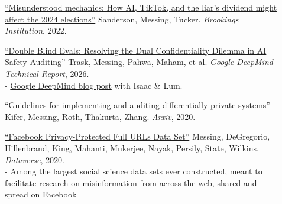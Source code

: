 \documentclass[letterpaper,11pt]{article}
\newcommand{\resheading}[1]{\vspace{4pt}{\large
\colorbox{mygrey}{\begin{minipage}{\textwidth}{\textbf{#1
\vphantom{p\^{E}}}}\end{minipage}}}\vspace{4pt}}
\begin{document}
\resheading{Reports \& Datasets}
\begin{description}

\item[] \href{https://www.brookings.edu/articles/misunderstood-mechanics-how-ai-tiktok-and-the-liars-dividend-might-affect-the-2024-elections/}{``Misunderstood mechanics: How AI, TikTok, and the liar's dividend might affect the 2024 elections''} Sanderson, Messing, Tucker.
\emph{Brookings Institution}, 2022. 

\item[] \href{https://storage.googleapis.com/deepmind-media/DeepMind.com/Blog/piloting-the-worlds-first-double-blind-ai-evaluations/double-blind-evaluations-technical-report.pdf}{``Double Blind Evals: Resolving the Dual Confidentiality Dilemma in AI Safety Auditing''} Trask, Messing, Pahwa, Maham, et al.
\emph{Google DeepMind Technical Report}, 2026. \\
- \href{https://deepmind.google/blog/piloting-the-worlds-first-double-blind-ai-evaluations/}{Google DeepMind blog post} with Isaac \& Lum.

\item[] \href{https://arxiv.org/abs/2002.04049}{``Guidelines for implementing and auditing differentially private systems''} Kifer, Messing, Roth, Thakurta, Zhang.
\emph{Arxiv}, 2020. 

\item[] \href{https://dataverse.harvard.edu/dataset.xhtml?persistentId=doi:10.7910/DVN/TDOAPG}{``Facebook Privacy-Protected Full URLs Data Set''} Messing, DeGregorio, Hillenbrand, King, Mahanti, Mukerjee, Nayak, Persily, State, Wilkins.
\emph{Dataverse}, 2020.  \\
- Among the largest social science data sets ever constructed, meant to facilitate research on misinformation from across the web, shared and spread on Facebook




\end{description}
\end{document}

